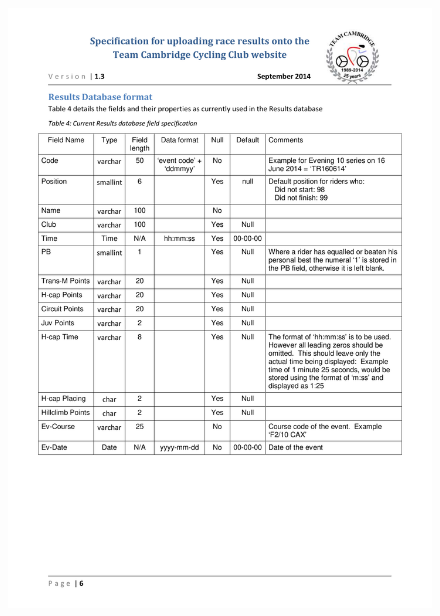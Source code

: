 \begin{figure}[H]
    \includegraphics[width=\textwidth]{./TeamCambridgeSpec/page6.pdf}
\end{figure}

